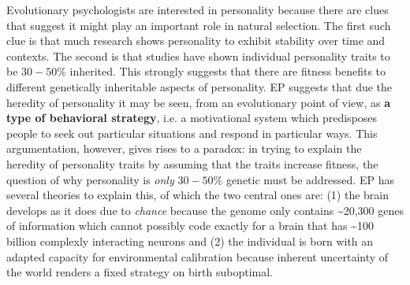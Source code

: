 Evolutionary psychologists are interested in personality because there are clues that suggest it might play an important role in natural selection. The first such clue is that much research shows personality to exhibit stability over time and contexts. The second is that studies have shown individual personality traits to be $30-50\%$ inherited. This strongly suggests that there are fitness benefits to different genetically inheritable aspects of personality.
EP suggests that due the heredity of personality it may be seen, from an evolutionary point of view, as \textbf{a type of behavioral strategy}, i.e. a motivational system which predisposes people to seek out particular situations and respond in particular ways.
This argumentation, however, gives rises to a paradox: in trying to explain the heredity of personality traits by assuming that the traits increase fitness, the question of why personality is \textit{only} $30-50\%$ genetic must be addressed.
EP has several theories to explain this, of which the two central ones are: (1) the brain develops as it does due to \textit{chance} because the genome only contains \textasciitilde20,300 genes of information which cannot possibly code exactly for a brain that has \textasciitilde100 billion complexly interacting neurons and (2) the individual is born with an adapted capacity for environmental calibration because inherent uncertainty of the world renders a fixed strategy on birth suboptimal.



